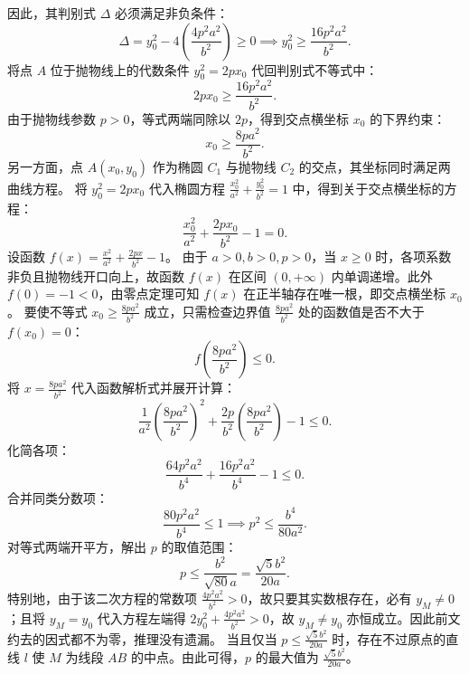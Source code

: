 \begin{solution}
因此，其判别式 $\Delta$ 必须满足非负条件：
\[ \Delta = y_0^2 - 4\left(\frac{4p^2 a^2}{b^2}\right) \ge 0 \implies y_0^2 \ge \frac{16p^2 a^2}{b^2}. \]
将点 $A$ 位于抛物线上的代数条件 $y_0^2 = 2px_0$ 代回判别式不等式中：
\[ 2px_0 \ge \frac{16p^2 a^2}{b^2}. \]
由于抛物线参数 $p > 0$，等式两端同除以 $2p$，得到交点横坐标 $x_0$ 的下界约束：
\[ x_0 \ge \frac{8p a^2}{b^2}. \]
另一方面，点 $A(x_0, y_0)$ 作为椭圆 $C_1$ 与抛物线 $C_2$ 的交点，其坐标同时满足两曲线方程。
将 $y_0^2 = 2px_0$ 代入椭圆方程 $\frac{x_0^2}{a^2} + \frac{y_0^2}{b^2} = 1$ 中，得到关于交点横坐标的方程：
\[ \frac{x_0^2}{a^2} + \frac{2px_0}{b^2} - 1 = 0. \]
设函数 $f(x) = \frac{x^2}{a^2} + \frac{2px}{b^2} - 1$。
由于 $a>0, b>0, p>0$，当 $x \ge 0$ 时，各项系数非负且抛物线开口向上，故函数 $f(x)$ 在区间 $(0, +\infty)$ 内单调递增。此外 $f(0) = -1 < 0$，由零点定理可知 $f(x)$ 在正半轴存在唯一根，即交点横坐标 $x_0$。
要使不等式 $x_0 \ge \frac{8p a^2}{b^2}$ 成立，只需检查边界值 $\frac{8p a^2}{b^2}$ 处的函数值是否不大于 $f(x_0)=0$：
\[ f\left(\frac{8p a^2}{b^2}\right) \le 0. \]
将 $x = \frac{8p a^2}{b^2}$ 代入函数解析式并展开计算：
\[ \frac{1}{a^2} \left( \frac{8p a^2}{b^2} \right)^2 + \frac{2p}{b^2} \left( \frac{8p a^2}{b^2} \right) - 1 \le 0. \]
化简各项：
\[ \frac{64p^2 a^2}{b^4} + \frac{16p^2 a^2}{b^4} - 1 \le 0. \]
合并同类分数项：
\[ \frac{80p^2 a^2}{b^4} \le 1 \implies p^2 \le \frac{b^4}{80a^2}. \]
对等式两端开平方，解出 $p$ 的取值范围：
\[ p \le \frac{b^2}{\sqrt{80}a} = \frac{\sqrt{5}b^2}{20a}. \]
特别地，由于该二次方程的常数项 $\frac{4p^2 a^2}{b^2} > 0$，故只要其实数根存在，必有 $y_M \neq 0$；且将 $y_M = y_0$ 代入方程左端得 $2y_0^2 + \frac{4p^2 a^2}{b^2} > 0$，故 $y_M \neq y_0$ 亦恒成立。因此前文约去的因式都不为零，推理没有遗漏。
当且仅当 $p \le \frac{\sqrt{5}b^2}{20a}$ 时，存在不过原点的直线 $l$ 使 $M$ 为线段 $AB$ 的中点。由此可得，$p$ 的最大值为 $\frac{\sqrt{5}b^2}{20a}$。
\end{solution}

